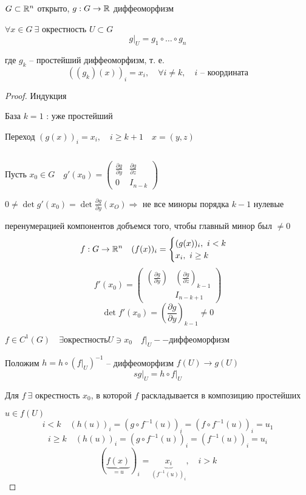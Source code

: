     \begin{lemma} %
        $G \subset \mathbb{R}^n$ открыто, $g : G \rightarrow \mathbb{R}$ диффеоморфизм
        \par $\forall x \in G \ \exists$ окрестность $U \subset G$
        \[
            g\big|_U = g_1 \circ \dots \circ g_n    
        \]
        \par где $g_k$ -- простейший диффеоморфизм, т. е.
        \[
            ((g_k)(x))_i = x_i, \quad \forall i \not= k, \quad i \text{ -- координата}  
        \]
    \end{lemma}
    \begin{proof}
        Индукция
        \par База $k=1$ : уже простейший
        \par Переход \quad $(g(x))_i = x_i , \quad i \ge k+1 \quad x = (y, z)$ %
        \par $ $
        \par Пусть $x_0 \in G \quad g'(x_0) = \begin{pmatrix}
            \frac{\partial g}{\partial y} & \frac{\partial g}{\partial z} \\
            0 & I_{n-k}
        \end{pmatrix}$
        \par $0 \not= \det g'(x_0) = \det \frac{\partial g}{\partial y} (x_O) \Rightarrow$ не все миноры порядка $k-1$ нулевые
        \par \quad перенумерацией компонентов добъемся того, чтобы главный минор был $\not= 0$
        \[
            f : G \rightarrow \mathbb{R}^n \quad (f(x))_i = \begin{cases}
                (g(x))_i, \ i < k \\
                x_i, \ i \ge k
            \end{cases}    
        \]
        \[
            f'(x_0) = \begin{pmatrix}
                \left(\frac{\partial g}{\partial y}\right) & \left(\frac{\partial g}{\partial z}\right)_{k-1} \\
                & I_{n-k+1}
            \end{pmatrix}    
        \]
        \[
            \det f'(x_0) = \left(\frac{\partial g}{\partial y}\right)_{k-1} \not= 0    
        \]

        \par $f \in C^1(G) \quad \exists окрестность U \ni x_0 \quad f\big|_{U} -- диффеоморфизм$
        \par Положим $h = h \circ (f\big|_{U})^{-1}$ -- диффеоморфизм $f(U) \rightarrow g(U)$
        \[
            sg\big|_U = h \circ f\big|_U
        \]
        \par Для $f \ \exists$ окрестность $x_0$, в которой $f$ раскладывается в композицию простейших
        \par $u \in f(U)$
        \[
            i < k \quad (h(u))_i = (g \circ f^{-1}(u))_i = (f \circ f^{-1}(u))_i = u_1
        \]
        \[
            i \ge k \quad (h(u))_i = (g \circ f^{-1}(u))_i = (f^{-1}(u))_i = u_i    
        \]
        \[
            (\underbrace{f(x)}_{=u})_i = \underbrace{x_i}_{(f^{-1}(u))_i}, \quad i > k    
        \]
    \end{proof}

